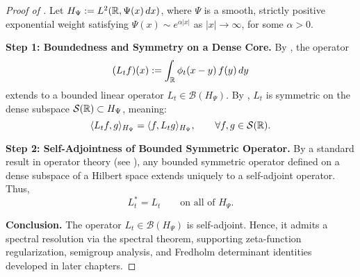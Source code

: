 \begin{proof}[Proof of ]
Let \( H_\Psi := L^2(\mathbb{R}, \Psi(x)\, dx) \), where \( \Psi \) is a smooth, strictly positive exponential weight satisfying \( \Psi(x) \sim e^{\alpha|x|} \) as \( |x| \to \infty \), for some \( \alpha > 0 \).

\medskip
\noindent\textbf{Step 1: Boundedness and Symmetry on a Dense Core.}
By , the operator
\[
(L_t f)(x) := \int_{\mathbb{R}} \phi_t(x - y)\, f(y)\, dy
\]
extends to a bounded linear operator \( L_t \in \mathcal{B}(H_\Psi) \). By , \( L_t \) is symmetric on the dense subspace \( \mathcal{S}(\mathbb{R}) \subset H_\Psi \), meaning:
\[
\langle L_t f, g \rangle_{H_\Psi} = \langle f, L_t g \rangle_{H_\Psi}, \qquad \forall f, g \in \mathcal{S}(\mathbb{R}).
\]

\medskip
\noindent\textbf{Step 2: Self-Adjointness of Bounded Symmetric Operator.}
By a standard result in operator theory (see \cite[Theorem~VI.1]{ReedSimon1980I}), any bounded symmetric operator defined on a dense subspace of a Hilbert space extends uniquely to a self-adjoint operator. Thus,
\[
L_t^* = L_t \qquad \text{on all of } H_\Psi.
\]

\medskip
\noindent\textbf{Conclusion.}
The operator \( L_t \in \mathcal{B}(H_\Psi) \) is self-adjoint. Hence, it admits a spectral resolution via the spectral theorem, supporting zeta-function regularization, semigroup analysis, and Fredholm determinant identities developed in later chapters.
\end{proof}
